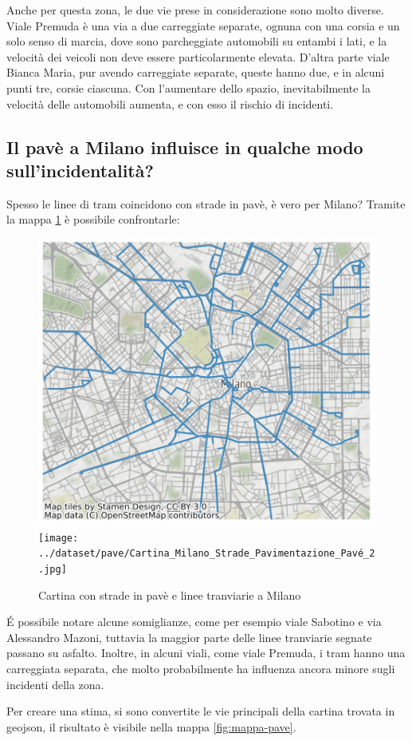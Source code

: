 \documentclass[a4paper]{report}
\begin{document}
Anche per questa zona, le due vie prese in considerazione sono molto diverse.
Viale Premuda è una via a due carreggiate separate, ognuna con una corsia e un solo senso di marcia, 
dove sono parcheggiate automobili su entambi i lati, e la velocità dei veicoli non deve essere 
particolarmente elevata.
D'altra parte viale Bianca Maria, pur avendo carreggiate separate, queste hanno due, 
e in alcuni punti tre, corsie ciascuna. 
Con l'aumentare dello spazio, inevitabilmente la velocità delle automobili aumenta, 
e con esso il rischio di incidenti.


\subsection{Il pavè a Milano influisce in qualche modo sull'incidentalità?}

Spesso le linee di tram coincidono con strade in pavè, è vero per Milano? 
Tramite la mappa \ref{fig:tram-pave-milano} è possibile confrontarle: 

\begin{figure}
    \includegraphics[width=0.48\linewidth]{../src/tram/tram_milano.png}
    \texttt{[image: ../dataset/pave/Cartina\_Milano\_Strade\_Pavimentazione\_Pavé\_2.jpg]}
    \caption{Cartina con strade in pavè e linee tranviarie a Milano}
    \label{fig:tram-pave-milano}
\end{figure}

\'E possibile notare alcune somiglianze, come per esempio viale Sabotino e via Alessandro Mazoni, 
tuttavia la maggior parte delle linee tranviarie segnate passano su asfalto.
Inoltre, in alcuni viali, come viale Premuda, i tram hanno una carreggiata separata, 
che molto probabilmente ha influenza ancora minore sugli incidenti della zona.

Per creare una stima, si sono convertite le vie principali della cartina trovata 
in geojson, il risultato è visibile nella mappa \ref{fig:mappa-pave}.
\end{document}
